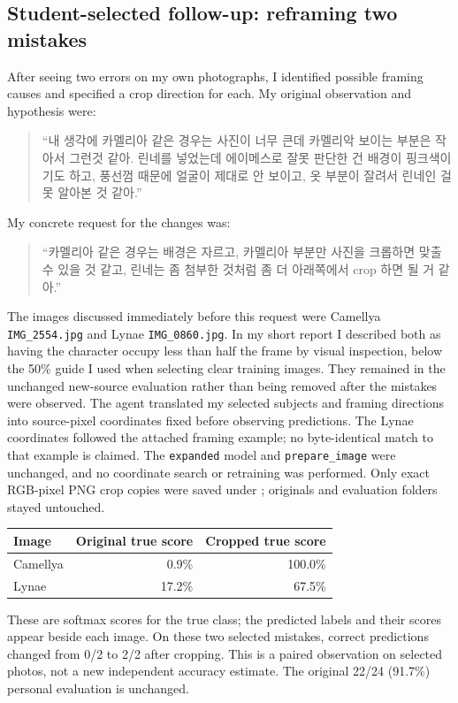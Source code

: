 \documentclass[11pt]{article}
\begin{document}
\subsection*{Student-selected follow-up: reframing two mistakes}
\label{p7:student_crop_request}
After seeing two errors on my own photographs, I identified possible framing causes and specified a crop direction for each. My original observation and hypothesis were:
\begin{quote}
``내 생각에 카멜리아 같은 경우는 사진이 너무 큰데 카멜리악 보이는 부분은 작아서 그런것 같아. 린네를 넣었는데 에이메스로 잘못 판단한 건 배경이 핑크색이기도 하고, 풍선껌 때문에 얼굴이 제대로 안 보이고, 옷 부분이 잘려서 린네인 걸 못 알아본 것 같아.''
\end{quote}
My concrete request for the changes was:
\begin{quote}
``카멜리아 같은 경우는 배경은 자르고, 카멜리아 부분만 사진을 크롭하면 맞출 수 있을 것 같고, 린네는 좀 첨부한 것처럼 좀 더 아래쪽에서 crop 하면 될 거 같아.''
\end{quote}
The images discussed immediately before this request were Camellya \texttt{IMG\_2554.jpg} and Lynae \texttt{IMG\_0860.jpg}. In my short report I described both as having the character occupy less than half the frame by visual inspection, below the 50\% guide I used when selecting clear training images. They remained in the unchanged new-source evaluation rather than being removed after the mistakes were observed. The agent translated my selected subjects and framing directions into source-pixel coordinates fixed before observing predictions. The Lynae coordinates followed the attached framing example; no byte-identical match to that example is claimed. The \texttt{expanded} model and \texttt{prepare\_image} were unchanged, and no coordinate search or retraining was performed. Only exact RGB-pixel PNG crop copies were saved under ; originals and evaluation folders stayed untouched.

\begin{center}\begin{tabular}{lrr}
\toprule Image & Original true score & Cropped true score \\
\midrule
Camellya & 0.9\% & 100.0\% \\
Lynae & 17.2\% & 67.5\% \\
\bottomrule\end{tabular}\end{center}
These are softmax scores for the true class; the predicted labels and their scores appear beside each image. On these two selected mistakes, correct predictions changed from 0/2 to 2/2 after cropping. This is a paired observation on selected photos, not a new independent accuracy estimate. The original 22/24 (91.7\%) personal evaluation is unchanged.
\end{document}
